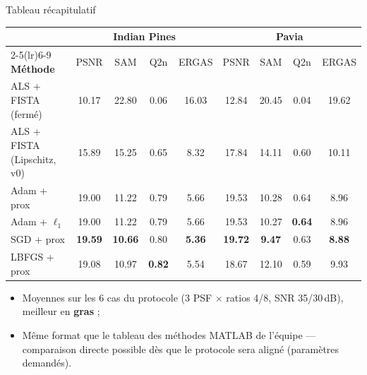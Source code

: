 \documentclass[10pt,aspectratio=169]{beamer}
\begin{document}
\begin{frame}{Tableau récapitulatif}
\centering
\begin{tabular}{@{}lcccc@{\hskip 18pt}cccc@{}}
\toprule
 & \multicolumn{4}{c}{\textbf{Indian Pines}} & \multicolumn{4}{c}{\textbf{Pavia}} \\
\cmidrule(lr){2-5}\cmidrule(lr){6-9}
\textbf{Méthode} & PSNR & SAM & Q2n & ERGAS & PSNR & SAM & Q2n & ERGAS \\
\midrule
ALS + FISTA (fermé) & 10.17 & 22.80 & 0.06 & 16.03 & 12.84 & 20.45 & 0.04 & 19.62 \\
ALS + FISTA (Lipschitz, v0) & 15.89 & 15.25 & 0.65 & 8.32 & 17.84 & 14.11 & 0.60 & 10.11 \\
Adam + prox & 19.00 & 11.22 & 0.79 & 5.66 & 19.53 & 10.28 & 0.64 & 8.96 \\
Adam + $\ell_1$ & 19.00 & 11.22 & 0.79 & 5.66 & 19.53 & 10.27 & \textbf{0.64} & 8.96 \\
SGD + prox & \textbf{19.59} & \textbf{10.66} & 0.80 & \textbf{5.36} & \textbf{19.72} & \textbf{9.47} & 0.63 & \textbf{8.88} \\
LBFGS + prox & 19.08 & 10.97 & \textbf{0.82} & 5.54 & 18.67 & 12.10 & 0.59 & 9.93 \\
\bottomrule
\end{tabular}
\bigskip
\begin{itemize}
  \item Moyennes sur les 6 cas du protocole (3 PSF $\times$ ratios 4/8,
        SNR 35/30\,dB), meilleur en \textbf{gras} ;
  \item Même format que le tableau des méthodes MATLAB de l'équipe —
        comparaison directe possible dès que le protocole sera aligné
        (paramètres demandés).
\end{itemize}
\end{frame}
\end{document}
